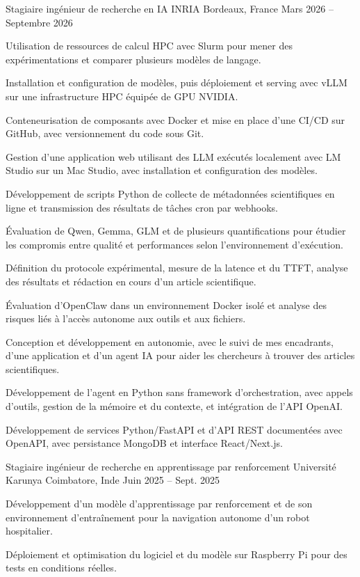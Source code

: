 
\begin{cventries}
  \cventry
    {Stagiaire ingénieur de recherche en IA}
    {INRIA}
    {Bordeaux, France}
    {Mars 2026 -- Septembre 2026}
    {
      \begin{cvitems}
        \item {Utilisation de ressources de calcul HPC avec Slurm pour mener des expérimentations et comparer plusieurs modèles de langage.}
        \item {Installation et configuration de modèles, puis déploiement et serving avec vLLM sur une infrastructure HPC équipée de GPU NVIDIA.}
        \item {Conteneurisation de composants avec Docker et mise en place d’une CI/CD sur GitHub, avec versionnement du code sous Git.}
        \item {Gestion d’une application web utilisant des LLM exécutés localement avec LM Studio sur un Mac Studio, avec installation et configuration des modèles.}
        \item {Développement de scripts Python de collecte de métadonnées scientifiques en ligne et transmission des résultats de tâches cron par webhooks.}
        \item {Évaluation de Qwen, Gemma, GLM et de plusieurs quantifications pour étudier les compromis entre qualité et performances selon l’environnement d’exécution.}
        \item {Définition du protocole expérimental, mesure de la latence et du TTFT, analyse des résultats et rédaction en cours d’un article scientifique.}
        \item {Évaluation d’OpenClaw dans un environnement Docker isolé et analyse des risques liés à l’accès autonome aux outils et aux fichiers.}
        \item {Conception et développement en autonomie, avec le suivi de mes encadrants, d’une application et d’un agent IA pour aider les chercheurs à trouver des articles scientifiques.}
        \item {Développement de l’agent en Python sans framework d’orchestration, avec appels d’outils, gestion de la mémoire et du contexte, et intégration de l’API OpenAI.}
        \item {Développement de services Python/FastAPI et d’API REST documentées avec OpenAPI, avec persistance MongoDB et interface React/Next.js.}
      \end{cvitems}
    }

  \cventry
    {Stagiaire ingénieur de recherche en apprentissage par renforcement}
    {Université Karunya}
    {Coimbatore, Inde}
    {Juin 2025 -- Sept. 2025}
    {
      \begin{cvitems}
        \item {Développement d’un modèle d’apprentissage par renforcement et de son environnement d’entraînement pour la navigation autonome d’un robot hospitalier.}
        \item {Déploiement et optimisation du logiciel et du modèle sur Raspberry Pi pour des tests en conditions réelles.}
      \end{cvitems}
    }
\end{cventries}
